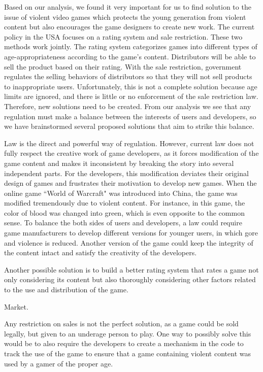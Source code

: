 \indent\indent Based on our analysis, we found it very important for us to find solution to the issue of violent video games which protects the young generation from violent content but also encourages the game designers to create new work. The current policy in the USA focuses on a rating system and sale restriction. These two methods work jointly. The rating system categorizes games into different types of age-appropriateness according to the game's content. Distributors will be able to sell the product based on their rating. With the sale restriction, government regulates the selling behaviors of distributors so that they will not sell products to inappropriate users. \textcolor{ProcessBlue}{Unfortunately, this is not a complete solution because age limits are ignored, and there is little or no enforcement of the sale restriction law. Therefore, new solutions need to be created. From our analysis we see that any regulation must make a balance between the interests of users and developers, so we have brainstormed several proposed solutions that aim to strike this balance. }

Law is the direct and powerful way of regulation. However, current law  does not fully respect the creative work of game developers, as it forces modification of the game content and makes it inconsistent by breaking the story into several independent parts. For the developers, this modification deviates their original design of games and frustrates their motivation to develop new games. When the online game ``World of Warcraft" was introduced into China, the game was modified tremendously due to violent content. For instance, in this game, the color of blood was changed into green, which is even opposite to the common sense. To balance the both sides of users and developers, a law could require game manufacturers to develop different versions for younger users, in which gore and violence is reduced. Another version of the game could keep the integrity of the content intact and satisfy the creativity of the developers. 

Another possible solution is to build a better rating system that rates a game not only considering its content but also thoroughly considering other factors related to the use and distribution of the game. 

Market. 

\textcolor{ProcessBlue}{Any restriction on sales is not the perfect solution, as a game could be sold legally, but given to an underage person to play.} One way to possibly solve this would be to also require the developers to create a mechanism in the code to track the use of the game to ensure that a game containing violent content was used by a gamer of the proper age.


